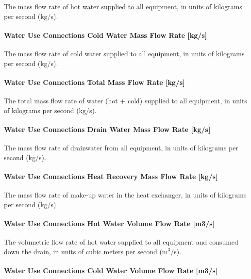 The mass flow rate of hot water supplied to all equipment, in units of kilograms per second (kg/s).

\paragraph{Water Use Connections Cold Water Mass Flow Rate {[}kg/s{]}}\label{water-use-connections-cold-water-mass-flow-rate-kgs}

The mass flow rate of cold water supplied to all equipment, in units of kilograms per second (kg/s).

\paragraph{Water Use Connections Total Mass Flow Rate {[}kg/s{]}}\label{water-use-connections-total-mass-flow-rate-kgs}

The total mass flow rate of water (hot + cold) supplied to all equipment, in units of kilograms per second (kg/s).

\paragraph{Water Use Connections Drain Water Mass Flow Rate {[}kg/s{]}}\label{water-use-connections-drain-water-mass-flow-rate-kgs}

The mass flow rate of drainwater from all equipment, in units of kilograms per second (kg/s).

\paragraph{Water Use Connections Heat Recovery Mass Flow Rate {[}kg/s{]}}\label{water-use-connections-heat-recovery-mass-flow-rate-kgs}

The mass flow rate of make-up water in the heat exchanger, in units of kilograms per second (kg/s).

\paragraph{Water Use Connections Hot Water Volume Flow Rate {[}m3/s{]}}\label{water-use-connections-hot-water-volume-flow-rate-m3s}

The volumetric flow rate of hot water supplied to all equipment and consumed down the drain, in units of cubic meters per second (m\(^{3}\)/s).

\paragraph{Water Use Connections Cold Water Volume Flow Rate {[}m3/s{]}}\label{water-use-connections-cold-water-volume-flow-rate-m3s}

